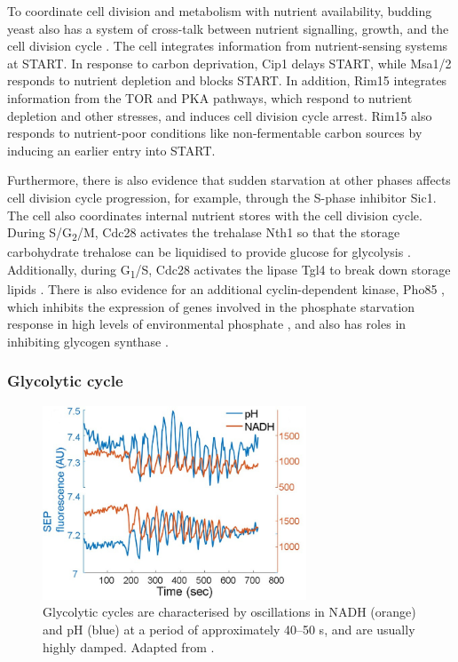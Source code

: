 To coordinate cell division and metabolism with nutrient availability, budding yeast also has a system of cross-talk between nutrient signalling, growth, and the cell division cycle \parencite{ewaldHowYeastCoordinates2018}.
The cell integrates information from nutrient-sensing systems at START\@.
In response to carbon deprivation, Cip1 delays START, while Msa1/2 responds to nutrient depletion and blocks START\@.
In addition, Rim15 integrates information from the TOR and PKA pathways, which respond to nutrient depletion and other stresses, and induces cell division cycle arrest.
Rim15 also responds to nutrient-poor conditions like non-fermentable carbon sources by inducing an earlier entry into START\@.

Furthermore, there is also evidence that sudden starvation at other phases affects cell division cycle progression, for example, through the S-phase inhibitor Sic1.
The cell also coordinates internal nutrient stores with the cell division cycle.
During S/G\textsubscript{2}/M, Cdc28 activates the trehalase Nth1 so that the storage carbohydrate trehalose can be liquidised to provide glucose for glycolysis \parencite{ewaldYeastCyclinDependentKinase2016}.
Additionally, during G\textsubscript{1}/S, Cdc28 activates the lipase Tgl4 to break down storage lipids \parencite{kuratCdk1Cdc28DependentActivation2009}.
There is also evidence for an additional cyclin-dependent kinase, Pho85 \parencite{huangPho85MultifunctionalCyclindependent2007}, which inhibits the expression of genes involved in the phosphate starvation response in high levels of environmental phosphate \parencite{oneillRegulationPHO4Nuclear1996}, and also has roles in inhibiting glycogen synthase \parencite{wilsonSubstrateTargetingYeast1999}.


\subsubsection{Glycolytic cycle}
\label{subsubsec:intro-glycolytic}

\begin{figure}
  \centering
  \includegraphics[width=0.7\textwidth]{doddLiveCellImaging2017_3a_adapted}
  \caption[
    Glycolytic cycles
  ]{
    Glycolytic cycles are characterised by oscillations in NADH (orange) and pH (blue) at a period of approximately 40--50 s, and are usually highly damped.
    Adapted from \textcite{doddLiveCellImaging2017a}.}
  \label{fig:intro-glycolytic-overview}
\end{figure}

